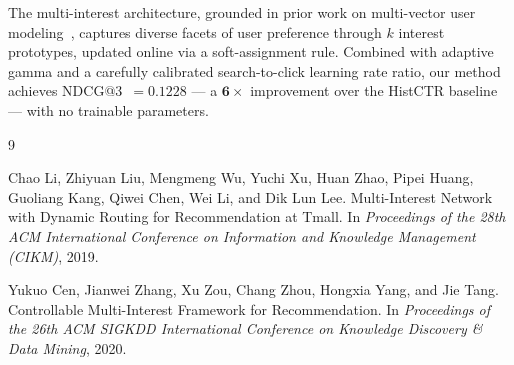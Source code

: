 \documentclass[10pt,twocolumn]{article}
\begin{document}
The multi-interest architecture, grounded in prior work on multi-vector
user modeling~\cite{li2019mind,cen2020comirec}, captures diverse facets
of user preference through $k$ interest prototypes, updated online via
a soft-assignment rule.
Combined with adaptive gamma and a carefully calibrated
search-to-click learning rate ratio, our method achieves
NDCG@3~$= 0.1228$ --- a $\mathbf{6\times}$ improvement over the
HistCTR baseline --- with no trainable parameters.

\begin{thebibliography}{9}

  Chao Li, Zhiyuan Liu, Mengmeng Wu, Yuchi Xu, Huan Zhao, Pipei Huang,
  Guoliang Kang, Qiwei Chen, Wei Li, and Dik Lun Lee.
  \newblock Multi-Interest Network with Dynamic Routing for Recommendation
    at Tmall.
  \newblock In \textit{Proceedings of the 28th ACM International Conference
    on Information and Knowledge Management (CIKM)}, 2019.

  Yukuo Cen, Jianwei Zhang, Xu Zou, Chang Zhou, Hongxia Yang, and Jie Tang.
  \newblock Controllable Multi-Interest Framework for Recommendation.
  \newblock In \textit{Proceedings of the 26th ACM SIGKDD International
    Conference on Knowledge Discovery \& Data Mining}, 2020.

\end{thebibliography}
\end{document}
